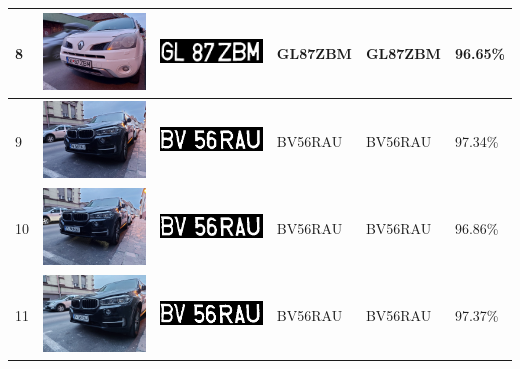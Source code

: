 \documentclass[a4paper,12pt]{report}
\begin{document}
\begin{longtable}{| m{0.6cm} | m{3cm} | m{3cm} | m{1.8cm} | m{1.8cm} | m{1.8cm} |}
    8   & \includegraphics[width=3cm,keepaspectratio]{dataset/3_d1.jpg}   & \includegraphics[width=3cm,keepaspectratio]{segmentari/8.jpg}   & GL87ZBM             & GL87ZBM              & 96.65\%    \\ \hline
    9   & \includegraphics[width=3cm,keepaspectratio]{dataset/4_d1.jpg}   & \includegraphics[width=3cm,keepaspectratio]{segmentari/9.jpg}   & BV56RAU             & BV56RAU              & 97.34\%    \\ \hline
    10  & \includegraphics[width=3cm,keepaspectratio]{dataset/4_d2.jpg}   & \includegraphics[width=3cm,keepaspectratio]{segmentari/10.jpg}  & BV56RAU             & BV56RAU              & 96.86\%    \\ \hline
    11  & \includegraphics[width=3cm,keepaspectratio]{dataset/4_d3.jpg}   & \includegraphics[width=3cm,keepaspectratio]{segmentari/11.jpg}  & BV56RAU             & BV56RAU              & 97.37\%    \\ \hline

\end{longtable}
\end{document}
